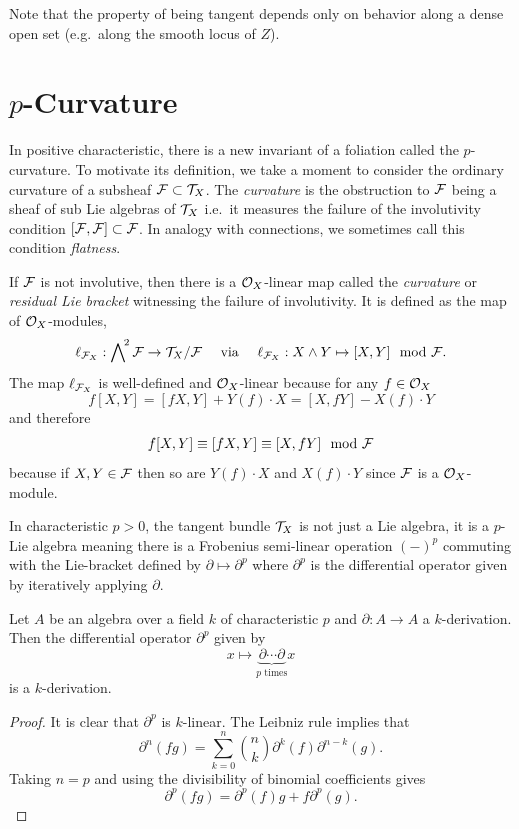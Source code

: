 \documentclass[main.tex]{subfiles}
\begin{document}
Note that the property of being tangent depends only on behavior along a dense open set (e.g.\ along the smooth locus of $Z$). 

\section{$p$-Curvature}

In positive characteristic, there is a new invariant of a foliation called the $p$-curvature. To motivate its definition, we take a moment to consider the ordinary curvature of a subsheaf $\mathcal{F} \subset \mathcal{T}_X$. The \textit{curvature} is the obstruction to $\mathcal{F}$ being a sheaf of sub Lie algebras of $\mathcal{T}_X$ i.e.\ it measures the failure of the involutivity condition $[\mathcal{F}, \mathcal{F}] \subset \mathcal{F}$. In analogy with connections, we sometimes call this condition \textit{flatness}. 

\begin{defn}
If $\mathcal{F}$ is not involutive, then there is a $\mathcal{O}_X$-linear map called the \textit{curvature} or \textit{residual Lie bracket} witnessing the failure of involutivity. It is defined as the map of $\mathcal{O}_X$-modules,
\[ \ell_{\mathcal{F}_X} : \bigwedge\nolimits^{\! 2} \mathcal{F} \to \mathcal{T}_X / \mathcal{F} \quad \text{ via } \quad \ell_{\mathcal{F}_X} : X \wedge Y \mapsto [X,Y] \mod {\mathcal{F}}. \]
The map $\ell_{\mathcal{F}_X}$ is well-defined and $\mathcal{O}_X$-linear because for any $f \in \mathcal{O}_X$
\[ f [X,Y] = [f X, Y] + Y(f) \cdot X = [X, f Y] - X(f) \cdot Y \]
and therefore
\[ f [X, Y] \equiv [f X, Y] \equiv [X, f Y] \mod {\mathcal{F}} \]
because if $X, Y \in \mathcal{F}$ then so are $Y(f) \cdot X$ and $X(f) \cdot Y$ since $\mathcal{F}$ is a $\mathcal{O}_X$-module.
\end{defn}

In characteristic $p > 0$, the tangent bundle $\mathcal{T}_X$ is not just a Lie algebra, it is a $p$-Lie algebra meaning there is a Frobenius semi-linear operation $(-)^{p}$ commuting with the Lie-bracket defined by $\partial \mapsto \partial^p$ where $\partial^p$ is the differential operator given by iteratively applying $\partial$. 

\begin{lemma}
Let $A$ be an algebra over a field $k$ of characteristic $p$ and $\partial : A \to A$ a $k$-derivation. Then the differential operator $\partial^p$ given by
\[ x \mapsto \underbrace{\partial \cdots \partial}_{p \text{ times}} x \]
is a $k$-derivation.
\end{lemma}

\begin{proof}
It is clear that $\partial^p$ is $k$-linear. The Leibniz rule implies that
\[ \partial^n(fg) = \sum_{k = 0}^n { n \choose k} \partial^k(f) \partial^{n-k}(g). \]
Taking $n = p$ and using the divisibility of binomial coefficients gives
\[ \partial^p(fg) = \partial^p(f) g + f \partial^p(g). \]
\end{proof}
\end{document}
